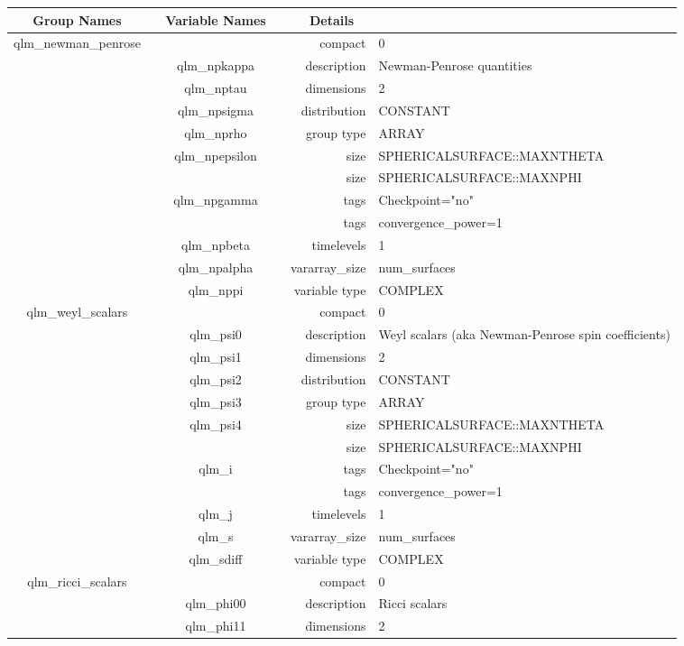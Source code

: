 \vspace{5mm}
\vspace{5mm}

\begin{tabular*}{150mm}{|c|c@{\extracolsep{\fill}}|rl|} \hline 
~ {\bf Group Names} ~ & ~ {\bf Variable Names} ~  &{\bf Details} ~ & ~ \\ 
\hline 
qlm\_newman\_penrose &  & compact & 0 \\ 
 & qlm\_npkappa & description & Newman-Penrose quantities \\ 
 & qlm\_nptau & dimensions & 2 \\ 
 & qlm\_npsigma & distribution & CONSTANT \\ 
 & qlm\_nprho & group type & ARRAY \\ 
 & qlm\_npepsilon & size & SPHERICALSURFACE::MAXNTHETA \\ 
& ~ & size & SPHERICALSURFACE::MAXNPHI \\ 
 & qlm\_npgamma & tags & Checkpoint="no" \\ 
& ~ & tags & convergence\_power=1 \\ 
 & qlm\_npbeta & timelevels & 1 \\ 
 & qlm\_npalpha & vararray\_size & num\_surfaces \\ 
 & qlm\_nppi & variable type & COMPLEX \\ 
\hline 
qlm\_weyl\_scalars &  & compact & 0 \\ 
 & qlm\_psi0 & description & Weyl scalars (aka Newman-Penrose spin coefficients) \\ 
 & qlm\_psi1 & dimensions & 2 \\ 
 & qlm\_psi2 & distribution & CONSTANT \\ 
 & qlm\_psi3 & group type & ARRAY \\ 
 & qlm\_psi4 & size & SPHERICALSURFACE::MAXNTHETA \\ 
& ~ & size & SPHERICALSURFACE::MAXNPHI \\ 
 & qlm\_i & tags & Checkpoint="no" \\ 
& ~ & tags & convergence\_power=1 \\ 
 & qlm\_j & timelevels & 1 \\ 
 & qlm\_s & vararray\_size & num\_surfaces \\ 
 & qlm\_sdiff & variable type & COMPLEX \\ 
\hline 
qlm\_ricci\_scalars &  & compact & 0 \\ 
 & qlm\_phi00 & description & Ricci scalars \\ 
 & qlm\_phi11 & dimensions & 2 \\ 

\end{tabular*}
